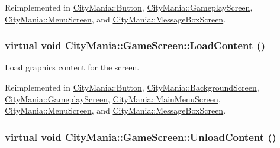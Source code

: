 Reimplemented in \hyperlink{classCityMania_1_1Button_a7ffb254c3a65d1357d6f3c6dee74c4ab}{CityMania::Button}, \hyperlink{classCityMania_1_1GameplayScreen_a3491283225749877c3325ebba7a9bd42}{CityMania::GameplayScreen}, \hyperlink{classCityMania_1_1MenuScreen_a9ec18d09465dd6ca3a476193bd25e0bd}{CityMania::MenuScreen}, and \hyperlink{classCityMania_1_1MessageBoxScreen_ac6d8b1716a1976f8769276ab078fed90}{CityMania::MessageBoxScreen}.\hypertarget{classCityMania_1_1GameScreen_a4dc3798784fff49b20280903d796c94c}{
\subsubsection[{LoadContent}]{\setlength{\rightskip}{0pt plus 5cm}virtual void CityMania::GameScreen::LoadContent ()}}
\label{classCityMania_1_1GameScreen_a4dc3798784fff49b20280903d796c94c}


Load graphics content for the screen. 

Reimplemented in \hyperlink{classCityMania_1_1Button_a6b056904b50808d69f7699dcde88415d}{CityMania::Button}, \hyperlink{classCityMania_1_1BackgroundScreen_a1baaefcb8bbe767c96ff168f43f9c327}{CityMania::BackgroundScreen}, \hyperlink{classCityMania_1_1GameplayScreen_a6bc115541e6000548bf828762044fd46}{CityMania::GameplayScreen}, \hyperlink{classCityMania_1_1MainMenuScreen_a784682ea2036cdefdbbf8ea642f70be0}{CityMania::MainMenuScreen}, \hyperlink{classCityMania_1_1MenuScreen_ad3892ecccfde65f286cebd1f83083cd1}{CityMania::MenuScreen}, and \hyperlink{classCityMania_1_1MessageBoxScreen_a0aa4e3fd4153ea36c090fbf7d2f428fe}{CityMania::MessageBoxScreen}.\hypertarget{classCityMania_1_1GameScreen_a038a86bacf5b7d62141477980312f49b}{
\subsubsection[{UnloadContent}]{\setlength{\rightskip}{0pt plus 5cm}virtual void CityMania::GameScreen::UnloadContent ()}}
\label{classCityMania_1_1GameScreen_a038a86bacf5b7d62141477980312f49b}


